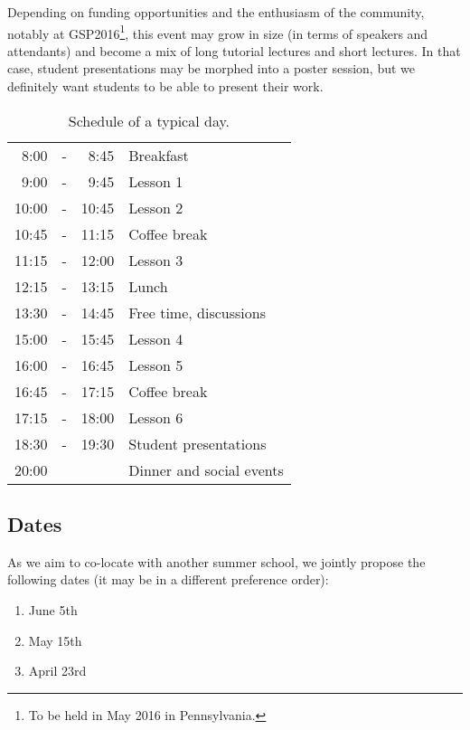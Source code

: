\documentclass[a4paper]{scrartcl}
\begin{document}
Depending on funding opportunities and the enthusiasm of the community, notably
at GSP2016\footnote{To be held in May 2016 in Pennsylvania.}, this event may
grow in size (in terms of speakers and attendants) and become a mix of long
tutorial lectures and short lectures. In that case, student presentations may be
morphed into a poster session, but we definitely want students to be able to
present their work.

\begin{table}[ht]
	\centering
	\begin{tabular}{rcrl}
	 8:00 & - &  8:45 & Breakfast \\
	 9:00 & - &  9:45 & Lesson 1 \\
	10:00 & - & 10:45 & Lesson 2 \\
	10:45 & - & 11:15 & Coffee break \\
	11:15 & - & 12:00 & Lesson 3 \\
	12:15 & - & 13:15 & Lunch \\
	13:30 & - & 14:45 & Free time, discussions \\
	15:00 & - & 15:45 & Lesson 4 \\
	16:00 & - & 16:45 & Lesson 5 \\
	16:45 & - & 17:15 & Coffee break \\
	17:15 & - & 18:00 & Lesson 6 \\
	18:30 & - & 19:30 & Student presentations \\
	20:00 &   &       & Dinner and social events
	\end{tabular}
	\caption{Schedule of a typical day.}
	\label{schedule}
\end{table}

\subsection{Dates}

As we aim to co-locate with another summer school, we jointly propose the
following dates (it may be in a different preference order):
\begin{enumerate}
	\setlength{\itemsep}{0pt} \setlength{\parskip}{0pt}
	\item June 5th
	\item May 15th
	\item April 23rd
\end{enumerate}
\end{document}
